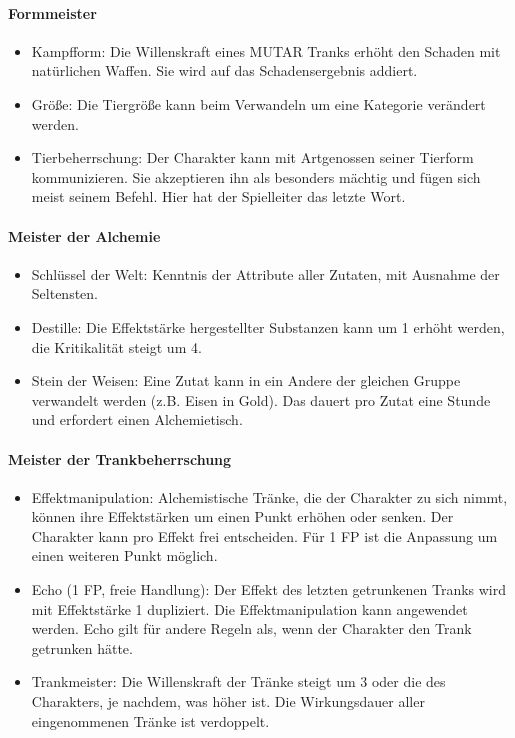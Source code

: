 \documentclass{article}
\begin{document}
\paragraph{Formmeister}

\begin{itemize}
\item Kampfform: Die Willenskraft eines MUTAR Tranks erhöht den Schaden mit natürlichen Waffen. Sie wird auf das Schadensergebnis addiert.
\item Größe: Die Tiergröße kann beim Verwandeln um eine Kategorie verändert werden.
\item Tierbeherrschung: Der Charakter kann mit Artgenossen seiner Tierform kommunizieren. Sie akzeptieren ihn als besonders mächtig und fügen sich meist seinem Befehl. Hier hat der Spielleiter das letzte Wort.
\end{itemize}

\paragraph{Meister der Alchemie}

\begin{itemize}
\item Schlüssel der Welt: Kenntnis der Attribute aller Zutaten, mit Ausnahme der Seltensten.
\item Destille: Die Effektstärke hergestellter Substanzen kann um 1 erhöht werden, die Kritikalität steigt um 4.
\item Stein der Weisen: Eine Zutat kann in ein Andere der gleichen Gruppe verwandelt werden (z.B. Eisen in Gold). Das dauert pro Zutat eine Stunde und erfordert einen Alchemietisch.
\end{itemize}

\paragraph{Meister der Trankbeherrschung}

\begin{itemize}
\item Effektmanipulation: Alchemistische Tränke, die der Charakter zu sich nimmt, können ihre Effektstärken um einen Punkt erhöhen oder senken. Der Charakter kann pro Effekt frei entscheiden. Für 1 FP ist die Anpassung um einen weiteren Punkt möglich.
\item Echo (1 FP, freie Handlung): Der Effekt des letzten getrunkenen Tranks wird mit Effektstärke 1 dupliziert. Die Effektmanipulation kann angewendet werden. Echo gilt für andere Regeln als, wenn der Charakter den Trank getrunken hätte.
\item Trankmeister: Die Willenskraft der Tränke steigt um 3 oder die des Charakters, je nachdem, was höher ist. Die Wirkungsdauer aller eingenommenen Tränke ist verdoppelt.
\end{itemize}
\end{document}

